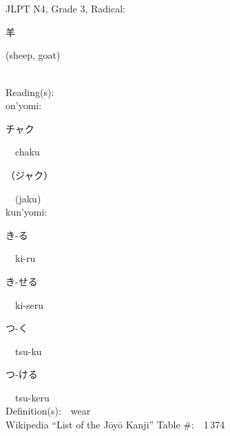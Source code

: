 \begin{multicols}{2}
\ \ \\
{\fontsize{34pt}{40pt}  }\ \ \\  %
{JLPT N4, Grade 3, Radical:\ \ {\begin{CJK}{UTF8}{min} 羊 \end{CJK}} (sheep, goat) } \\
Reading(s):\ \ \\
{\hspace*{1em}}on'yomi:\ \ \\
{\hspace*{2em}}{\begin{CJK}{UTF8}{min} チャク \end{CJK}}\ \ chaku\ \ \\
{\hspace*{2em}}{\begin{CJK}{UTF8}{min} （ジャク） \end{CJK}}\ \ (jaku)\ \ \\
{\hspace*{1em}}kun'yomi:\ \ \\
{\hspace*{2em}}{\begin{CJK}{UTF8}{min} き-る \end{CJK}}\ \ ki-ru\ \ \\
{\hspace*{2em}}{\begin{CJK}{UTF8}{min} き-せる \end{CJK}}\ \ ki-seru\ \ \\
{\hspace*{2em}}{\begin{CJK}{UTF8}{min} つ-く \end{CJK}}\ \ tsu-ku\ \ \\
{\hspace*{2em}}{\begin{CJK}{UTF8}{min} つ-ける \end{CJK}}\ \ tsu-keru\ \ \\
Definition(s):\ \ wear \\
Wikipedia ``List of the J\=oy\=o Kanji'' Table \#:\ \ 1\,374 \\
\ \ \\
{\fontsize{34pt}{40pt}  }\ \ \\  %

\end{multicols}
